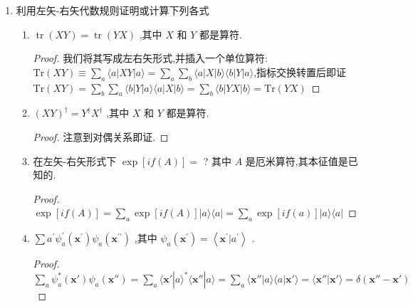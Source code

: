 \begin{enumerate}
\begin{proof}
\begin{equation}
		\end{equation}
		并注意到题干给出$\widehat{\mathbf{n}}$ 沿 $z$ 正方向,自然$n_x,n_y=0,n_z=1$再次发现其行列式恰好为$1$,并可以继续求得$a^{\prime}_k$,后续为基本的矩阵乘法,不单独列出,仅给出答案:
		\begin{equation}
			a^{\prime}_1=a_1\cos\phi+a_2\sin\phi,a^{\prime}_2=a_2\cos\phi-a_1\sin\phi,a^{\prime}_3=a_3
		\end{equation}
		现在我们不难看出,在$z$-方向上,显然我们刚刚执行了一个绕$z$轴的旋转(将矢量$\textbf{a}$绕$z$轴旋转$\phi$的角度).
	\end{proof}
	\item 利用左矢-右矢代数规则证明或计算下列各式
	\begin{enumerate}
		\item $\operatorname{tr}\left( {XY}\right) = \operatorname{tr}\left( {YX}\right)$ ,其中 $X$ 和 $Y$ 都是算符.
		\begin{proof}
			我们将其写成左右矢形式,并插入一个单位算符:$\mathrm{Tr}(XY)\equiv\sum_a\langle a|XY|a\rangle=\sum_a\sum_b\langle a|X|b\rangle\langle b|Y|a\rangle$,指标交换转置后即证$\mathrm{Tr}(XY)=\sum_b\sum_a\langle b|Y|a\rangle\langle a|X|b\rangle=\sum_b\langle b|YX|b\rangle=\mathrm{Tr}(YX)$
		\end{proof}
		\item ${\left( XY\right) }^{ \dagger } = {Y}^{ \dagger }{X}^{ \dagger }$ ,其中 $X$ 和 $Y$ 都是算符.
		\begin{proof}
			注意到对偶关系即证.
		\end{proof}
		\item 在左矢-右矢形式下 $\exp \left\lbrack {{if}\left( A\right) }\right\rbrack =$ ? 其中 $A$ 是厄米算符,其本征值是已知的.
		\begin{proof}
			$\exp[if(A)]=\sum_{a}\exp[if(A)]|a\rangle\langle a|=\sum_{a}\exp[if(a)]|a\rangle\langle a|$
		\end{proof}
		\item $\sum {a}^{\prime }{\psi }_{a}^{\prime }\left( {\mathbf{x}}^{\prime }\right) {\psi }_{a}\left( {\mathbf{x}}^{\prime \prime }\right)$ ,其中 ${\psi }_{a}\left( {\mathbf{x}}^{\prime }\right) = \left\langle {{\mathbf{x}}^{\prime } | {a}^{\prime }}\right\rangle$ .
		\begin{proof}
			$\sum_{a}\psi_{a}^{*}(\mathbf{x}')\psi_{a}(\mathbf{x}'')=\sum_{a}\langle\mathbf{x}'|a\rangle^{*}\langle\mathbf{x}''|a\rangle=\sum_{a}\langle\mathbf{x}''|a\rangle\langle a|\mathbf{x}'\rangle=\langle\mathbf{x}''|\mathbf{x}'\rangle=\delta(\mathbf{x}''-\mathbf{x}')$
		\end{proof}

\end{enumerate}
\end{enumerate}
